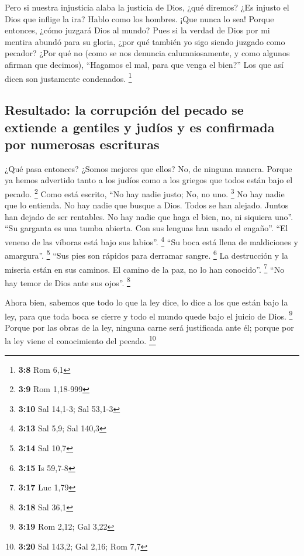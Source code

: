  Pero si nuestra injusticia alaba la justicia de Dios,
¿qué diremos? ¿Es injusto el Dios que inflige la ira? Hablo como los
hombres.  ¡Que nunca lo sea! Porque entonces, ¿cómo
juzgará Dios al mundo?  Pues si la verdad de Dios por mi
mentira abundó para su gloria, ¿por qué también yo sigo siendo juzgado
como pecador?  ¿Por qué no (como se nos denuncia
calumniosamente, y como algunos afirman que decimos), ``Hagamos el mal,
para que venga el bien?'' Los que así dicen son justamente condenados.
\footnote{\textbf{3:8} Rom 6,1}

\hypertarget{resultado-la-corrupciuxf3n-del-pecado-se-extiende-a-gentiles-y-juduxedos-y-es-confirmada-por-numerosas-escrituras}{%
\subsection{Resultado: la corrupción del pecado se extiende a gentiles y
judíos y es confirmada por numerosas
escrituras}\label{resultado-la-corrupciuxf3n-del-pecado-se-extiende-a-gentiles-y-juduxedos-y-es-confirmada-por-numerosas-escrituras}}

 ¿Qué pasa entonces? ¿Somos mejores que ellos? No, de
ninguna manera. Porque ya hemos advertido tanto a los judíos como a los
griegos que todos están bajo el pecado. \footnote{\textbf{3:9} Rom
  1,18-999}  Como está escrito, ``No hay nadie justo; No,
no uno. \footnote{\textbf{3:10} Sal 14,1-3; Sal 53,1-3} 
No hay nadie que lo entienda. No hay nadie que busque a Dios.
 Todos se han alejado. Juntos han dejado de ser
rentables. No hay nadie que haga el bien, no, ni siquiera uno''.
 ``Su garganta es una tumba abierta. Con sus lenguas han
usado el engaño''. ``El veneno de las víboras está bajo sus labios''.
\footnote{\textbf{3:13} Sal 5,9; Sal 140,3}  ``Su boca
está llena de maldiciones y amargura''. \footnote{\textbf{3:14} Sal 10,7}
 ``Sus pies son rápidos para derramar sangre. \footnote{\textbf{3:15}
  Is 59,7-8}  La destrucción y la miseria están en sus
caminos.  El camino de la paz, no lo han conocido''.
\footnote{\textbf{3:17} Luc 1,79}  ``No hay temor de Dios
ante sus ojos''. \footnote{\textbf{3:18} Sal 36,1}

 Ahora bien, sabemos que todo lo que la ley dice, lo dice
a los que están bajo la ley, para que toda boca se cierre y todo el
mundo quede bajo el juicio de Dios. \footnote{\textbf{3:19} Rom 2,12;
  Gal 3,22}  Porque por las obras de la ley, ninguna
carne será justificada ante él; porque por la ley viene el conocimiento
del pecado. \footnote{\textbf{3:20} Sal 143,2; Gal 2,16; Rom 7,7}

